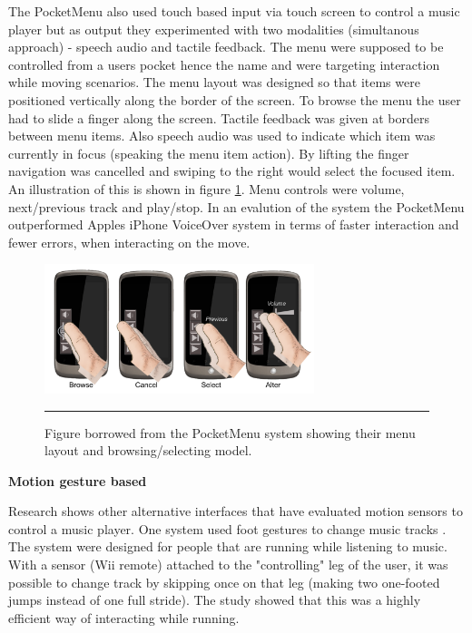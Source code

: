 The PocketMenu \cite{pielot_pocketmenu:_2012} also used touch based input via touch screen to control a music player but as output they experimented with two modalities (simultanous approach) - speech audio and tactile feedback. The menu were supposed to be controlled from a users pocket hence the name and were targeting interaction while moving scenarios. The menu layout was designed so that items were positioned vertically along the border of the screen. To browse the menu the user had to slide a finger along the screen. Tactile feedback was given at borders between menu items. Also speech audio was used to indicate which item was currently in focus (speaking the menu item action). By lifting the finger navigation was cancelled and swiping to the right would select the focused item. An illustration of this is shown in figure \ref{fig:pocketmenu}. Menu controls were volume, next/previous track and play/stop. In an evalution of the system the PocketMenu outperformed Apples iPhone VoiceOver system in terms of faster interaction and fewer errors, when interacting on the move.

\begin{figure}[t]
	\centering
		\includegraphics[width=0.7\textwidth,height=\textheight,keepaspectratio]{./Figures/pocketmenu.png}
		\rule{35em}{0.5pt}
	\caption[PocketMenu system]{Figure borrowed from the PocketMenu system \cite{pielot_pocketmenu:_2012} showing their menu layout and browsing/selecting model.}
	\label{fig:pocketmenu}
\end{figure}

\textbf{Motion gesture based}

Research shows other alternative interfaces that have evaluated motion sensors to control a music player. One system used foot gestures to change music tracks \cite{smus_running_2010}. The system were designed for people that are running while listening to music. With a sensor (Wii remote) attached to the "controlling" leg of the user, it was possible to change track by skipping once on that leg (making two one-footed jumps instead of one full stride). The study showed that this was a highly efficient way of interacting while running.

